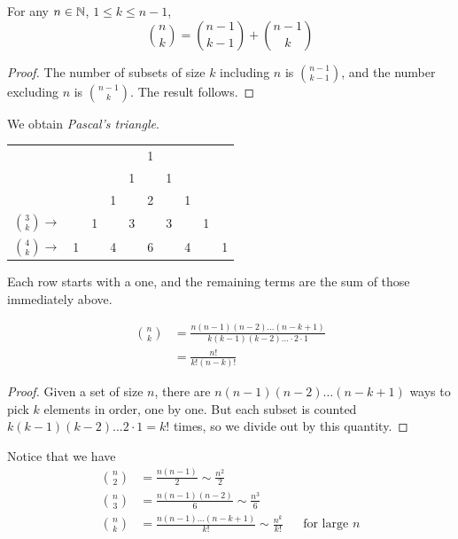 \documentclass{../template/note}
\begin{document}
    \begin{proposition}
        For any \(n \in \mathbb N\), \(1 \leq k \leq n-1\),
        \[
            \binom n k = \binom{n-1}{k-1} + \binom{n-1} k
        \]
    \end{proposition}


    \begin{proof}
        The number of subsets of size \(k\) including \(n\) is \(\binom{n-1}{k-1}\), and the number excluding \(n\) is \(\binom{n-1}{k}\). The result follows.
    \end{proof}

    We obtain \emph{Pascal's triangle}.

    \begin{center}
        \begin{tabular}{c c c c c c c c c c}
            & & & & & 1 & & & & \\
            & & & & 1 & & 1 & & & \\
            & & & 1 & & 2 & & 1 & & \\
            \(\binom 3 k \rightarrow\) & & 1 & & 3 & & 3 & & 1 & \\
            \(\binom 4 k \rightarrow\) & 1 & & 4 & & 6 & & 4 & & 1 \\
        \end{tabular}
    \end{center}

    Each row starts with a one, and the remaining terms are the sum of those immediately above.
    
    \begin{proposition}
        \begin{align*}
            \binom n k &= \frac{n(n-1)(n-2) \dots (n-k+1)}{k(k-1)(k-2)\dots \cdot 2 \cdot 1} \\
            &= \frac{n!}{k!(n-k)!}
        \end{align*}
    \end{proposition}
    
    \begin{proof}
        Given a set of size \(n\), there are \(n(n-1)(n-2)\dots(n-k+1)\) ways to pick \(k\) elements in order, one by one. But each subset is counted \(k(k-1)(k-2)\dots 2 \cdot 1 = k!\) times, so we divide out by this quantity.
    \end{proof}
    
    Notice that we have
    \begin{align*}
        \binom n 2  &= \frac{n(n-1)}{2} \sim \frac{n^2} 2 \\
        \binom n 3 &= \frac{n(n-1)(n-2)}{6} \sim \frac{n^3} 6  \\
        \binom n k &= \frac{n(n-1)\dots(n-k+1)}{k!} \sim \frac{n^k}{k!}&& \text{for large } n
    \end{align*}
\end{document}
